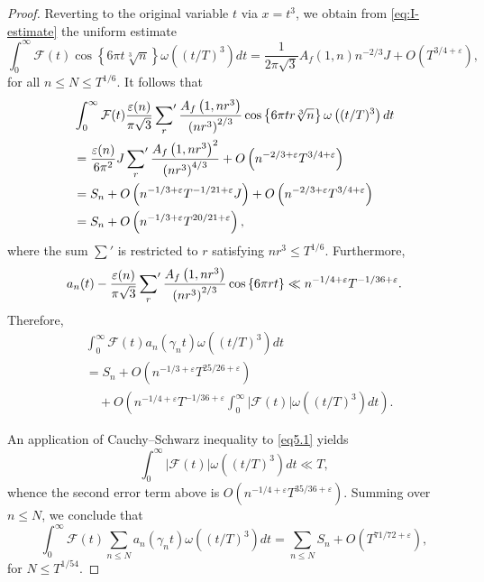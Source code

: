 \documentclass[10pt,leqno]{amsart}
\numberwithin{equation}{section}
\begin{document}
\begin{proof}
Reverting to the original variable $t$ via $x = t^3$, we obtain from \eqref{eq:I-estimate} the uniform estimate
\[
\int_0^{\infty} \mathcal{F}(t) \cos\left\{6\pi t\sqrt[3]{n}\right\} \omega \left((t/T)^3\right) dt
= \frac{1}{2\pi\sqrt{3}}   A_f(1, n)   n^{-2/3} J + O \left(T^{3/4+\varepsilon}\right),
\]
for all $n \le N \le T^{1/6}$. It follows that
\[
\begin{aligned}
&\int_0^{\infty} \mathcal{F}(t)   \frac{\varepsilon(n)}{\pi\sqrt{3}} \sideset{}{'}\sum_r \frac{A_f\left(1,n r^3\right)}{\left(n r^3\right)^{2/3}} \cos\left\{6\pi t r\sqrt[3]{n}\right\} \omega\left((t/T)^3\right) dt \\
&= \frac{\varepsilon(n)}{6\pi^2}   J \sideset{}{'}\sum_r \frac{A_f\left(1,n r^3\right)^2}{\left(n r^3\right)^{4/3}}
+ O\left(n^{-2/3+\varepsilon} T^{3/4+\varepsilon}\right) \\
&= S_n + O \left(n^{-1/3+\varepsilon}T^{-1/21+\varepsilon} J\right) + O\left(n^{-2/3+\varepsilon} T^{3/4+\varepsilon}\right) \\
&= S_n + O\left(n^{-1/3+\varepsilon} T^{20/21+\varepsilon}\right),
\end{aligned}
\]
where the sum $\sum'$ is restricted to $r$ satisfying $n r^3 \le T^{1/6}$.
Furthermore,
\[
a_n(t) - \frac{\varepsilon(n)}{\pi\sqrt{3}} \sideset{}{'}\sum_r \frac{A_f\left(1,n r^3\right)}{\left(n r^3\right)^{2/3}} \cos \left\{6\pi r t\right\}
\ll n^{-1/4+\varepsilon} T^{-1/36+\varepsilon}.
\]
Therefore,
\[
\begin{aligned}
&\int_0^{\infty} \mathcal{F}(t) a_n(\gamma_n t)   \omega \left((t/T)^3\right) dt \\
&= S_n + O \left(n^{-1/3+\varepsilon} T^{25/26+\varepsilon}\right) \\
&\quad + O \left( n^{-1/4+\varepsilon} T^{-1/36+\varepsilon} \int_0^{\infty} |\mathcal{F}(t)|   \omega \left((t/T)^3\right) dt \right).
\end{aligned}
\]

An application of Cauchy--Schwarz inequality to \eqref{eq5.1} yields
\[
\int_0^{\infty} |\mathcal{F}(t)|   \omega \left((t/T)^3\right) dt \ll T,
\]
whence the second error term above is $O \left(n^{-1/4+\varepsilon} T^{35/36+\varepsilon}\right)$. Summing over $n \le N$, we conclude that
\[
\int_0^{\infty} \mathcal{F}(t) \sum_{n \le N} a_n(\gamma_n t)   \omega \left((t/T)^3\right) dt
= \sum_{n \le N} S_n + O \left(T^{71/72+\varepsilon}\right),
\]
for $N \le T^{1/54}$.


\end{proof}
\end{document}
